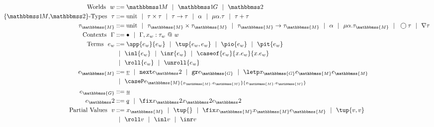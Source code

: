 
\newcommand{\exprM}{e_\mathbbmss{M}}
\newcommand{\exprG}{e_\mathbbmss{G}}
\newcommand{\exprT}{e_\bbtwo}
\newcommand{\varM}{x_\mathbbmss{M}}
\newcommand{\varG}{x_\mathbbmss{G}}
\newcommand{\varT}{x_\bbtwo}
\newcommand{\typeM}{\tau_\mathbbmss{M}}
\newcommand{\typeG}{\tau_\mathbbmss{G}}
\newcommand{\typeT}{\tau_\bbtwo}

\begin{figure}[t]
\begin{abstrsyn}
\[\begin{aligned}
\text{Worlds}\ \ 
\world &::= \bbonem \gbar \bbonep \gbar \bbtwo  \\
%
\text{\{\bbonem,\bbtwo\}-Types}\ \ 
\type &::= \text{unit}
 \gbar \type \times \type
 \gbar \type \to \type
 \gbar \alpha \gbar \mu \alpha.\tau 
 \gbar \tau + \tau \\
\typeM &::= \text{unit}
 \gbar \typeM \times \typeM
 \gbar \typeM \to \typeM
 \gbar \alpha \gbar \mu \alpha.\typeM 
 \gbar \fut \tau 
 \gbar \curr \tau \\
%
%
\text{Contexts}\ \ 
\context &::=\emptyC
 \gbar \context, x_w:\tau_w~@~w \\
%
\text{Terms}\ \ 
e_w &::= \app {e_w} {e_w} 
 \gbar \tup{e_w, e_w}
 \gbar \pio {e_w} 
 \gbar \pit {e_w} \\
&\gbar \inl {e_w} \gbar \inr {e_w}
 \gbar \caseof {e_w}{\var.e_w}{\var.e_w} \\
&\gbar \roll {e_w} \gbar \unroll {e_w} \\
\exprM &::= \exv v
 \gbar \next \exprT 
 \gbar \pure \exprG 
 \gbar \letp \varG \exprM \exprM \\
&\gbar \caseP \exprM {\varM.\exprM} {\varM.\exprM} \\
\exprG &::= \exv u \\ 
\exprT &::= \exv q
 \gbar \fix \varT \varT \exprT \\ 
\text{Partial Values}\ \ 
v &::= \varM
 \gbar\tup{}
 \gbar \fix \varM \varM \exprM
 \gbar \tup{v, v} \\
&\gbar \roll v
 \gbar \inl v 
 \gbar \inr v \\

\end{aligned}\]
\end{abstrsyn}
\end{figure}
